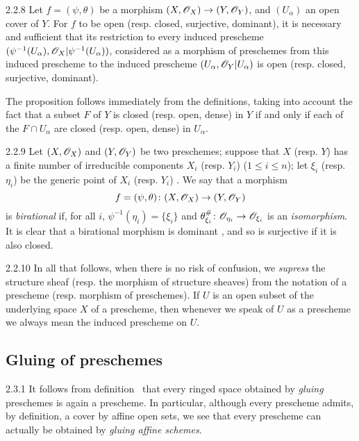 \documentclass{book}
\begin{document}
\begin{envs}[Proposition]{2.2.8}
\label{prop-1.2.2.8}
Let $f=(\psi,\theta)$ be a morphism
$(X,\mathscr{O}_X)\to(Y,\mathscr{O}_Y)$, and $(U_\alpha)$ an open cover of $Y$. For $f$ to be
open (resp. closed, surjective, dominant), it is necessary and sufficient that
its restriction to every induced prescheme
$(\psi^{-1}(U_\alpha),\mathscr{O}_X|\psi^{-1}(U_\alpha))$, considered as a morphism of
preschemes from this induced prescheme to the induced prescheme
$(U_\alpha,\mathscr{O}_Y|U_\alpha)$ is open (resp. closed, surjective, dominant).
\end{envs}

The proposition follows immediately from the definitions, taking into
account the fact that a subset $F$ of $Y$ is closed (resp. open, dense) in $Y$
if and only if each of the $F\cap U_\alpha$ are closed (resp. open, dense) in
$U_\alpha$.

\begin{env}{2.2.9}
\label{env-1.2.2.9}
Let $(X,\mathscr{O}_X)$ and $(Y,\mathscr{O}_Y)$ be two preschemes; suppose that
$X$ (resp. $Y$) has a finite number of irreducible components $X_i$ (resp.
$Y_i$) ($1\leqslant i\leqslant n$); let $\xi_i$ (resp. $\eta_i$) be the generic
point of $X_i$ (resp. $Y_i$) . We say that a morphism
\[
  f=(\psi,\theta)\colon(X,\mathscr{O}_X)\to(Y,\mathscr{O}_Y)
\]
is \emph{birational} if, for all $i$, $\psi^{-1}(\eta_i)=\{\xi_i\}$ and
$\theta_{\xi_i}^\#\colon\mathscr{O}_{\eta_i}\to\mathscr{O}_{\xi_i}$ is an \emph{isomorphism}. It
is clear that a birational morphism is dominant , and so is
surjective if it is also closed.
\end{env}

\begin{env}{2.2.10}
\label{rmk-1.2.2.10}
In all that follows, when there is
no risk of confusion, we \emph{supress} the structure sheaf (resp. the morphism
of structure sheaves) from the notation of a prescheme (resp. morphism of
preschemes). If $U$ is an open subset of the underlying space $X$ of a
prescheme, then whenever we speak of $U$ as a prescheme we always mean the
induced prescheme on $U$.
\end{env}

\subsection{Gluing of preschemes}
\label{1-schemes-2.3}

\begin{env}{2.3.1}
\label{env-1.2.3.1}
It follows from definition~ that every ringed space obtained by
\emph{gluing} preschemes  is again a prescheme. In particular, although every
prescheme admits, by definition, a cover by affine open sets, we see that every prescheme can
actually be obtained by \emph{gluing affine schemes}.
\end{env}
\end{document}
